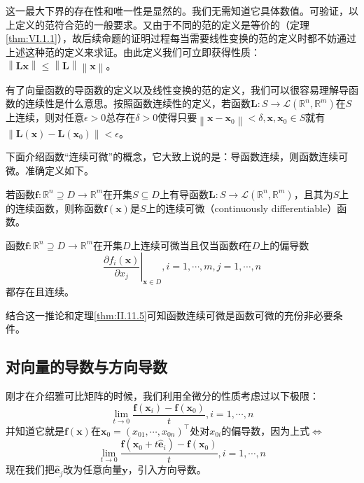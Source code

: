 \documentclass[main.tex]{subfiles}
\begin{document}
这一最大下界的存在性和唯一性是显然的。我们无需知道它具体数值。可验证，以上定义的范符合范的一般要求。又由于不同的范的定义是等价的（定理\ref{thm:VI.1.1}），故后续命题的证明过程每当需要线性变换的范的定义时都不妨通过上述这种范的定义来求证。由此定义我们可立即获得性质：$\left\|\mathbf{Lx}\right\|\leq\left\|\mathbf{L}\right\|\left\|\mathbf{x}\right\|$。

有了向量函数的导函数的定义以及线性变换的范的定义，我们可以很容易理解导函数的连续性是什么意思。按照函数连续性的定义，若函数$\mathbf{L}:S\rightarrow\mathcal{L}\left(\mathbb{R}^n,\mathbb{R}^m\right)$在$S$上连续，则对任意$\epsilon>0$总存在$\delta>0$使得只要$\left\|\mathbf{x}-\mathbf{x}_0\right\|<\delta,\mathbf{x},\mathbf{x}_0\in S$就有$\left\|\mathbf{L}\left(\mathbf{x}\right)-\mathbf{L}\left(\mathbf{x}_0\right)\right\|<\epsilon$。

下面介绍函数“连续可微”的概念，它大致上说的是：导函数连续，则函数连续可微。准确定义如下。

\begin{definition}[连续可微函数]
若函数$\mathbf{f}:\mathbb{R}^n\supseteq D\rightarrow\mathbb{R}^m$在开集$S\subseteq D$上有导函数$\mathbf{L}:S\rightarrow\mathcal{L}\left(\mathbb{R}^n,\mathbb{R}^m\right)$，且其为$S$上的连续函数，则称函数$\mathbf{f}\left(\mathbf{x}\right)$是$S$上的连续可微（continuously differentiable）函数。
\end{definition}

\begin{corollary}
函数$\mathbf{f}:\mathbb{R}^n\supseteq D\rightarrow\mathbb{R}^m$在开集$D$上连续可微当且仅当函数$\mathbf{f}$在$D$上的偏导数
\[
\left.\frac{\partial f_i\left(\mathbf{x}\right)}{\partial x_j}\right|_{\mathbf{x}\in D},i=1,\cdots,m,j=1,\cdots,n
\]
都存在且连续。
\end{corollary}

结合这一推论和定理\ref{thm:II.11.5}可知函数连续可微是函数可微的充份非必要条件。

\subsection{对向量的导数与方向导数}
刚才在介绍雅可比矩阵的时候，我们利用全微分的性质考虑过以下极限：
\[
\lim_{t\to 0}\frac{\mathbf{f}\left(\mathbf{x}_i\right)-\mathbf{f}\left(\mathbf{x}_0\right)}{t},i=1,\cdots,n\]
并知道它就是$\mathbf{f}\left(\mathbf{x}\right)$在$\mathbf{x}_0=\left(x_{01},\cdots,x_{0n}\right)^\intercal$处对$x_{0i}$的偏导数，因为上式$\Leftrightarrow$
\[
\lim_{t\rightarrow 0}\frac{\mathbf{f}\left(\mathbf{x}_0+t\mathbf{\hat{e}}_i\right)-\mathbf{f}\left(\mathbf{x}_0\right)}{t},i=1,\cdots,n
\]
现在我们把$\mathbf{\hat{e}}_j$改为任意向量$\mathbf{y}$，引入方向导数。
\end{document}
